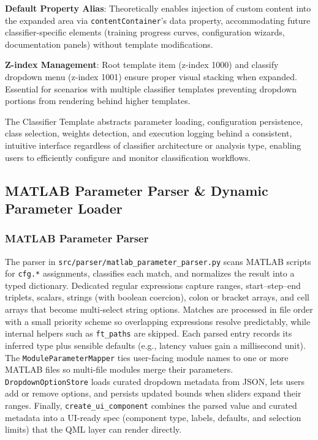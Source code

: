 \documentclass[12pt]{report}
\begin{document}
\textbf{Default Property Alias}: Theoretically enables injection of custom content into the expanded area via \verb|contentContainer|'s data property, accommodating future classifier-specific elements (training progress curves, configuration wizards, documentation panels) without template modifications.

\textbf{Z-index Management}: Root template item (z-index 1000) and classify dropdown menu (z-index 1001) ensure proper visual stacking when expanded. Essential for scenarios with multiple classifier templates preventing dropdown portions from rendering behind higher templates.

The Classifier Template abstracts parameter loading, configuration persistence, class selection, weights detection, and execution logging behind a consistent, intuitive interface regardless of classifier architecture or analysis type, enabling users to efficiently configure and monitor classification workflows.



\subsection{MATLAB Parameter Parser \& Dynamic Parameter Loader}
\subsubsection{MATLAB Parameter Parser}

The parser in \verb|src/parser/matlab_parameter_parser.py| scans MATLAB scripts for \verb|cfg.*| assignments, classifies each match, and normalizes the result into a typed dictionary. Dedicated regular expressions capture ranges, start--step--end triplets, scalars, strings (with boolean coercion), colon or bracket arrays, and cell arrays that become multi-select string options. Matches are processed in file order with a small priority scheme so overlapping expressions resolve predictably, while internal helpers such as \verb|ft_paths| are skipped. Each parsed entry records its inferred type plus sensible defaults (e.g., latency values gain a millisecond unit). The \verb|ModuleParameterMapper| ties user-facing module names to one or more MATLAB files so multi-file modules merge their parameters. \verb|DropdownOptionStore| loads curated dropdown metadata from JSON, lets users add or remove options, and persists updated bounds when sliders expand their ranges. Finally, \verb|create_ui_component| combines the parsed value and curated metadata into a UI-ready spec (component type, labels, defaults, and selection limits) that the QML layer can render directly.
\end{document}
